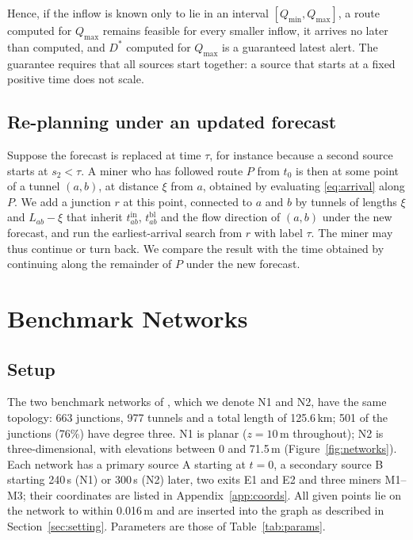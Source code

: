 \documentclass[11pt,a4paper]{article}
\theoremstyle{plain}
\theoremstyle{definition}
\theoremstyle{remark}
\newcommand{\tin}{t^{\mathrm{in}}}
\newcommand{\tbl}{t^{\mathrm{bl}}}
\begin{document}
Hence, if the inflow is known only to lie in an interval $[Q_{\min}, Q_{\max}]$, a route computed for $Q_{\max}$ remains feasible for every smaller inflow, it arrives no later than computed, and $D^*$ computed for $Q_{\max}$ is a guaranteed latest alert. The guarantee requires that all sources start together: a source that starts at a fixed positive time does not scale.

\subsection{Re-planning under an updated forecast}\label{sec:replan}
Suppose the forecast is replaced at time $\tau$, for instance because a second source starts at $s_2 < \tau$. A miner who has followed route $P$ from $t_0$ is then at some point of a tunnel $(a, b)$, at distance $\xi$ from $a$, obtained by evaluating \eqref{eq:arrival} along $P$. We add a junction $r$ at this point, connected to $a$ and $b$ by tunnels of lengths $\xi$ and $L_{ab} - \xi$ that inherit $\tin_{ab}$, $\tbl_{ab}$ and the flow direction of $(a, b)$ under the new forecast, and run the earliest-arrival search from $r$ with label $\tau$. The miner may thus continue or turn back. We compare the result with the time obtained by continuing along the remainder of $P$ under the new forecast.

\section{Benchmark Networks}\label{sec:benchmarks}

\subsection{Setup}
The two benchmark networks of \cite{cumcm}, which we denote N1 and N2, have the same topology: 663 junctions, 977 tunnels and a total length of 125.6\,km; 501 of the junctions (76\%) have degree three. N1 is planar ($z = 10$\,m throughout); N2 is three-dimensional, with elevations between 0 and 71.5\,m (Figure~\ref{fig:networks}). Each network has a primary source A starting at $t=0$, a secondary source B starting 240\,s (N1) or 300\,s (N2) later, two exits E1 and E2 and three miners M1--M3; their coordinates are listed in Appendix~\ref{app:coords}. All given points lie on the network to within 0.016\,m and are inserted into the graph as described in Section~\ref{sec:setting}. Parameters are those of Table~\ref{tab:params}.
\end{document}
